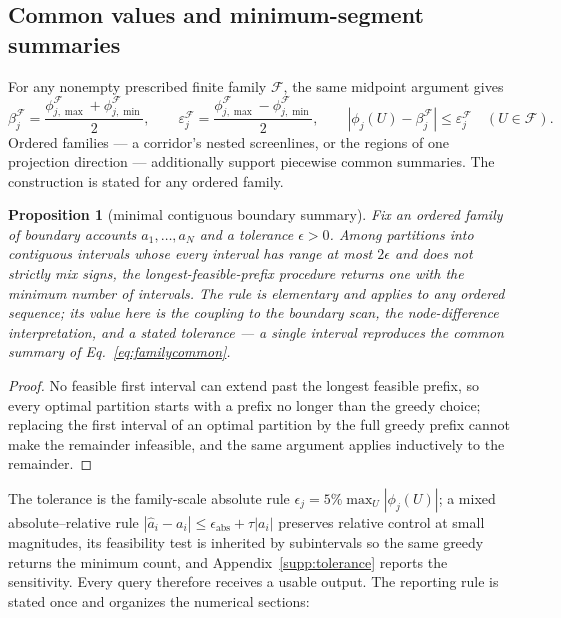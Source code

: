 \documentclass[a4paper,fleqn]{cas-sc}
\newtheorem{proposition}[theorem]{Proposition}
\begin{document}
\subsection{Common values and minimum-segment summaries}\label{sec:segments}
For any nonempty prescribed finite family $\mathcal F$, the same midpoint argument gives
\begin{equation}
\beta_j^{\mathcal F}=\frac{\phi_{j,\max}^{\mathcal F}+\phi_{j,\min}^{\mathcal F}}2,
\qquad \varepsilon_j^{\mathcal F}=\frac{\phi_{j,\max}^{\mathcal F}-\phi_{j,\min}^{\mathcal F}}2,
\qquad |\phi_j(U)-\beta_j^{\mathcal F}|\le\varepsilon_j^{\mathcal F}\quad(U\in\mathcal F).
\label{eq:familycommon}
\end{equation}
Ordered families --- a corridor's nested screenlines, or the regions of
one projection direction --- additionally support piecewise common
summaries. The construction is stated for any ordered family.
\begin{proposition}[minimal contiguous boundary summary]\label{prop:segmented}
Fix an ordered family of boundary accounts $a_1,\ldots,a_N$ and a
tolerance $\epsilon>0$. Among partitions into contiguous intervals
whose every interval has range at most $2\epsilon$ and does not
strictly mix signs, the longest-feasible-prefix procedure returns one
with the minimum number of intervals. The rule is elementary and
applies to any ordered sequence; its value here is the coupling to the
boundary scan, the node-difference interpretation, and a stated
tolerance --- a single interval reproduces the common summary of
Eq.~\eqref{eq:familycommon}.
\end{proposition}
\begin{proof}
No feasible first interval can extend past the longest feasible prefix,
so every optimal partition starts with a prefix no longer than the
greedy choice; replacing the first interval of an optimal partition by
the full greedy prefix cannot make the remainder infeasible, and the
same argument applies inductively to the remainder.
\end{proof}
The tolerance is the family-scale absolute rule
$\epsilon_j=5\%\max_U|\phi_j(U)|$; a mixed absolute--relative rule
$|\hat a_i-a_i|\le\epsilon_{\mathrm{abs}}+\tau|a_i|$ preserves
relative control at small magnitudes, its feasibility test is inherited
by subintervals so the same greedy returns the minimum count, and
Appendix~\ref{supp:tolerance} reports the sensitivity.
Every query therefore receives a usable output. The reporting rule is
stated once and organizes the numerical sections:
\end{document}
